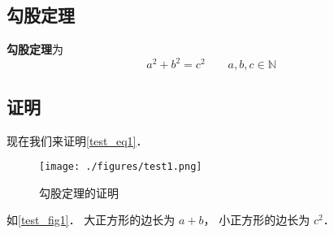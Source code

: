 

\subsection{勾股定理}
\textbf{勾股定理}为
\begin{equation}\label{test_eq1}
a^2 + b^2 = c^2 \qquad a,b,c \in \mathbb{N}
\end{equation}

\subsection{证明}
现在我们来证明\autoref{test_eq1}．

\begin{figure}[ht]
\centering
\texttt{[image: ./figures/test1.png]}
\caption{勾股定理的证明} \label{test_fig1}
\end{figure}

如\autoref{test_fig1}． 大正方形的边长为 $a + b$， 小正方形的边长为 $c^2$． 